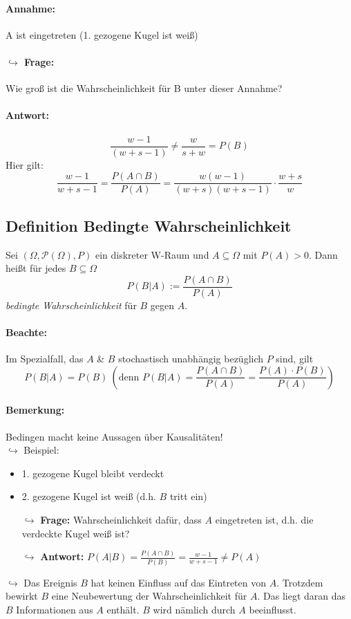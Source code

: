 \documentclass[12pt,a4paper]{article}
\begin{document}
 	\paragraph{Annahme:}
 	A ist eingetreten (1. gezogene Kugel ist weiß)
 	\paragraph{$\hookrightarrow$ Frage:} 
 	Wie groß ist die Wahrscheinlichkeit für B unter dieser Annahme?
 	\paragraph{Antwort:}
 	$$\frac{w-1}{(w+s-1)}\neq\frac{w}{s+w}=P(B)$$
 	Hier gilt: 
 	$$\frac{w-1}{w+s-1}=\frac{P(A\cap B)}{P(A)}=\frac{w(w-1)}{(w+s)(w+s-1)}\cdot\frac{w+s}{w}$$
 	\subsection{Definition Bedingte Wahrscheinlichkeit}
 	Sei $(\Omega,\mathcal{P}(\Omega),P)$ ein diskreter W-Raum und $A\subseteq\Omega$ mit $P(A)>0$. Dann heißt für jedes $B\subseteq\Omega$
 	$$P(B|A):=\frac{P(A\cap B)}{P(A)}$$
 	\textit{bedingte Wahrscheinlichkeit} für $B$ gegen $A$.
 	\paragraph{Beachte:}
 	Im Spezialfall, das $A$ \& $B$ stochastisch unabhängig bezüglich $P$ sind, gilt
 	$$P(B|A)=P(B) \: \left(\text{denn } P(B|A)=\frac{P(A\cap B)}{P(A)}=\frac{P(A)\cdot P(B)}{P(A)}\right)$$
 	\paragraph{Bemerkung:}
 	Bedingen macht keine Aussagen über Kausalitäten!\\
 	$\hookrightarrow$ Beispiel:
 	\begin{itemize}
 	\item 1. gezogene Kugel bleibt verdeckt
 	\item 2. gezogene Kugel ist weiß (d.h. $B$ tritt ein)
 	\item[$\hookrightarrow$] \textbf{Frage:} Wahrscheinlichkeit dafür, dass $A$ eingetreten ist, d.h. die verdeckte Kugel weiß ist?
 	\item[$\hookrightarrow$] \textbf{Antwort:} $P(A|B)=\frac{P(A\cap B)}{P(B)}=\frac{w-1}{w+s-1}\neq P(A)$
 	\end{itemize}
 	$\hookrightarrow$ Das Ereignis $B$ hat keinen Einfluss auf das Eintreten von $A$. Trotzdem bewirkt $B$ eine Neubewertung der Wahrscheinlichkeit für $A$. Das liegt daran das $B$ Informationen aus $A$ enthält. $B$ wird nämlich durch $A$ beeinflusst.
	
\end{document}
